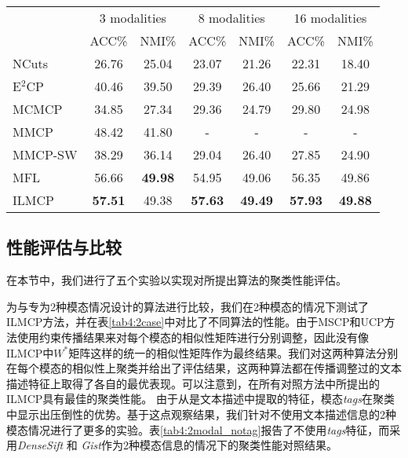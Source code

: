 \begin{table}[t]
    \label{tab4:modal2}
    \centering
    \setlength{\tabcolsep}{8pt}
    \begin{tabular}{l*{6}{c}}
        \toprule
        &\multicolumn{2}{c}{3 modalities} & \multicolumn{2}{c}{8 modalities} & \multicolumn{2}{c}{16 modalities}\\
        \cmidrule(lr){2-3}
        \cmidrule(lr){4-5}
        \cmidrule(lr){6-7}
        & ACC\% & NMI\% & ACC\% & NMI\% & ACC\% & NMI\%  \\
        \midrule
        NCuts\cite{shi2000normalized}  & 26.76 & 25.04 & 23.07 & 21.26 & 22.31 & 18.40  \\ 
        E$^2$CP\cite{lu2010constrained}  & 40.46 & 39.50 & 29.39 & 26.40 & 25.66 & 21.29 \\ 
        MCMCP\cite{fu2012modalities} & 34.85 & 27.34 & 29.36 & 24.79 & 29.80 & 24.98  \\ 
        MMCP\cite{fu2011multi}  & 48.42 & 41.80 & - & - & - & - \\ 
        MMCP-SW\cite{fu2011multi} & 38.29 & 36.14 & 29.04 & 26.40 & 27.85 & 24.90 \\ 
        MFL  & {56.66} & \textbf{49.98} & {54.95} & {49.06} & {56.35} &{49.86}\\
        ILMCP & \textbf{57.51} & {49.38} & \textbf{57.63} & \textbf{49.49} & \textbf{57.93} & \textbf{49.88} \\
        \bottomrule
    \end{tabular}
\end{table}

\subsection{性能评估与比较}
在本节中，我们进行了五个实验以实现对所提出算法的聚类性能评估。

为与专为2种模态情况设计的算法进行比较，我们在2种模态的情况下测试了ILMCP方法，并在表\ref{tab4:2case}中对比了不同算法的性能。由于MSCP和UCP方法使用约束传播结果来对每个模态的相似性矩阵进行分别调整，因此没有像ILMCP中${W^*}$矩阵这样的统一的相似性矩阵作为最终结果。我们对这两种算法分别在每个模态的相似性上聚类并给出了评估结果，这两种算法都在传播调整过的文本描述特征上取得了各自的最优表现。可以注意到，在所有对照方法中所提出的ILMCP具有最佳的聚类性能。
由于从是文本描述中提取的特征，模态\textit{tags}在聚类中显示出压倒性的优势。基于这点观察结果，我们针对不使用文本描述信息的2种模态情况进行了更多的实验。表\ref{tab4:2modal_notag}报告了不使用\textit{tags}特征，而采用\textit{DenseSift} 和 \textit{Gist}作为2种模态信息的情况下的聚类性能对照结果。

